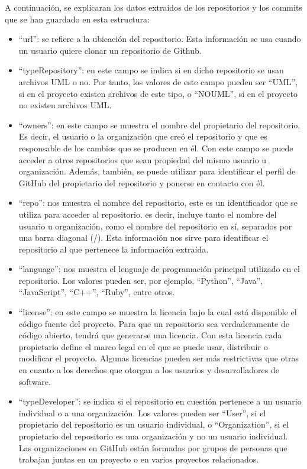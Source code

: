 \documentclass[a4paper, 12pt]{book}
\begin{document}
A continuación, se explicaran los datos extraídos de los repositorios y los commits que se han guardado en esta estructura:
\begin{itemize}
  \item ``url'': se refiere a la ubicación del repositorio.
  Esta información se usa cuando un usuario quiere clonar un repositorio de Github.

  \item ``typeRepository'': en este campo se indica si en dicho repositorio se usan archivos UML o no.
  Por tanto, los valores de este campo pueden ser ``UML'', si en el proyecto existen archivos de este tipo, o ``NOUML'', si en el proyecto no existen archivos UML.
  
  \item ``owners'': en este campo se muestra el nombre del propietario del repositorio. 
  Es decir, el usuario o la organización que creó el repositorio y que es responsable de los cambios que se producen en él. 
  Con este campo se puede acceder a otros repositorios que sean propiedad del mismo usuario u organización. 
  Además, también, se puede utilizar para identificar el perfil de GitHub del propietario del repositorio y ponerse en contacto con él.

  \item ``repo'': nos muestra el nombre del repositorio, este es un identificador que se utiliza para acceder al repositorio.  es decir, incluye tanto el nombre del usuario u organización, como el nombre del repositorio en sí, separados por una barra diagonal (/).
  Esta información nos sirve para identificar el repositorio al que pertenece la información extraída.

  \item ``language'': nos muestra el lenguaje de programación principal utilizado en el repositorio.
  Los valores pueden ser, por ejemplo, ``Python'', ``Java'', ``JavaScript'', ``C++'', ``Ruby'', entre otros.
  
  \item ``license'': en este campo se muestra la licencia bajo la cual está disponible el código fuente del proyecto.
  Para que un repositorio sea verdaderamente de código abierto, tendrá que generarse una licencia. 
  Con esta licencia cada propietario define el marco legal en el que se puede usar, distribuir o modificar el proyecto.
  Algunas licencias pueden ser más restrictivas que otras en cuanto a los derechos que otorgan a los usuarios y desarrolladores de software.
  
  \item ``typeDeveloper'': se indica si el repositorio en cuestión pertenece a un usuario individual o a una organización. 
  Los valores pueden ser ``User'', si el propietario del repositorio es un usuario individual, o ``Organization'', si el propietario del repositorio es una organización y no un usuario individual. 
  Las organizaciones en GitHub están formadas por grupos de personas que trabajan juntas en un proyecto o en varios proyectos relacionados.
  

\end{itemize}
\end{document}
